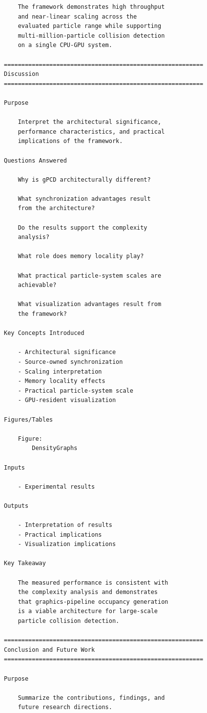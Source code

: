 \begin{verbatim}
    The framework demonstrates high throughput
    and near-linear scaling across the
    evaluated particle range while supporting
    multi-million-particle collision detection
    on a single CPU-GPU system.

=========================================================
Discussion
=========================================================

Purpose

    Interpret the architectural significance,
    performance characteristics, and practical
    implications of the framework.

Questions Answered

    Why is gPCD architecturally different?

    What synchronization advantages result
    from the architecture?

    Do the results support the complexity
    analysis?

    What role does memory locality play?

    What practical particle-system scales are
    achievable?

    What visualization advantages result from
    the framework?

Key Concepts Introduced

    - Architectural significance
    - Source-owned synchronization
    - Scaling interpretation
    - Memory locality effects
    - Practical particle-system scale
    - GPU-resident visualization

Figures/Tables

    Figure:
        DensityGraphs

Inputs

    - Experimental results

Outputs

    - Interpretation of results
    - Practical implications
    - Visualization implications

Key Takeaway

    The measured performance is consistent with
    the complexity analysis and demonstrates
    that graphics-pipeline occupancy generation
    is a viable architecture for large-scale
    particle collision detection.

=========================================================
Conclusion and Future Work
=========================================================

Purpose

    Summarize the contributions, findings, and
    future research directions.


\end{verbatim}
